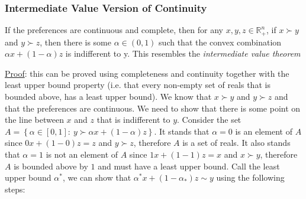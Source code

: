 \documentclass{article}
\begin{document}
  \par
\vspace{6mm}
\subsubsection{Intermediate Value Version of Continuity}
If the preferences are continuous and complete, then for any $x, y, z \in \mathbb{R}_{+}^{n}$, if $x \succ y$ and $y \succ z$, then there is some $\alpha \in (0,1)$ such that the convex combination $\alpha x + (1- \alpha)z$ is indifferent to y. This resembles the \textit{intermediate value theorem} \par \vspace{0.3em}
  \underline{Proof}: this can be proved using completeness and continuity together with the least upper bound property (i.e. that every non-empty set of reals that is bounded above, has a least upper bound). We know that $x \succ y$ and $y \succ z$ and that the preferences are continuous. We need to show that there is some point on the line between $x$ and $z$ that is indifferent to $y$. Consider the set $A = \left\{ \alpha \in [0,1]: \ y \succ \alpha x + (1- \alpha)z \right\}$. It stands that $\alpha = 0$ is an element of $A$ since $0x + (1 - 0)z = z$ and $y \succ z$, therefore $A$ is a set of reals. It also stands that $\alpha = 1$ is not an element of $A$ since $1x + (1-1)z = x$ and $x \succ y$, therefore $A$ is bounded above by $1$ and must have a least upper bound. Call the least upper bound $\alpha^{*}$, we can show that $\alpha^{*}x + (1 - \alpha_{*})z \sim y$ using the following steps:
\end{document}

